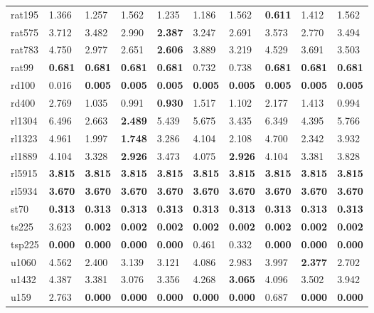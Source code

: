 \begin{tabular}{llllllllll}
rat195 & 1.366 & 1.257 & 1.562 & 1.235 & 1.186 & 1.562 & \textbf{0.611} & 1.412 & 1.562 \\
rat575 & 3.712 & 3.482 & 2.990 & \textbf{2.387} & 3.247 & 2.691 & 3.573 & 2.770 & 3.494 \\
rat783 & 4.750 & 2.977 & 2.651 & \textbf{2.606} & 3.889 & 3.219 & 4.529 & 3.691 & 3.503 \\
rat99 & \textbf{0.681} & \textbf{0.681} & \textbf{0.681} & \textbf{0.681} & 0.732 & 0.738 & \textbf{0.681} & \textbf{0.681} & \textbf{0.681} \\
rd100 & 0.016 & \textbf{0.005} & \textbf{0.005} & \textbf{0.005} & \textbf{0.005} & \textbf{0.005} & \textbf{0.005} & \textbf{0.005} & \textbf{0.005} \\
rd400 & 2.769 & 1.035 & 0.991 & \textbf{0.930} & 1.517 & 1.102 & 2.177 & 1.413 & 0.994 \\
rl1304 & 6.496 & 2.663 & \textbf{2.489} & 5.439 & 5.675 & 3.435 & 6.349 & 4.395 & 5.766 \\
rl1323 & 4.961 & 1.997 & \textbf{1.748} & 3.286 & 4.104 & 2.108 & 4.700 & 2.342 & 3.932 \\
rl1889 & 4.104 & 3.328 & \textbf{2.926} & 3.473 & 4.075 & \textbf{2.926} & 4.104 & 3.381 & 3.828 \\
rl5915 & \textbf{3.815} & \textbf{3.815} & \textbf{3.815} & \textbf{3.815} & \textbf{3.815} & \textbf{3.815} & \textbf{3.815} & \textbf{3.815} & \textbf{3.815} \\
rl5934 & \textbf{3.670} & \textbf{3.670} & \textbf{3.670} & \textbf{3.670} & \textbf{3.670} & \textbf{3.670} & \textbf{3.670} & \textbf{3.670} & \textbf{3.670} \\
st70 & \textbf{0.313} & \textbf{0.313} & \textbf{0.313} & \textbf{0.313} & \textbf{0.313} & \textbf{0.313} & \textbf{0.313} & \textbf{0.313} & \textbf{0.313} \\
ts225 & 3.623 & \textbf{0.002} & \textbf{0.002} & \textbf{0.002} & \textbf{0.002} & \textbf{0.002} & \textbf{0.002} & \textbf{0.002} & \textbf{0.002} \\
tsp225 & \textbf{0.000} & \textbf{0.000} & \textbf{0.000} & \textbf{0.000} & 0.461 & 0.332 & \textbf{0.000} & \textbf{0.000} & \textbf{0.000} \\
u1060 & 4.562 & 2.400 & 3.139 & 3.121 & 4.086 & 2.983 & 3.997 & \textbf{2.377} & 2.702 \\
u1432 & 4.387 & 3.381 & 3.076 & 3.356 & 4.268 & \textbf{3.065} & 4.096 & 3.502 & 3.942 \\
u159 & 2.763 & \textbf{0.000} & \textbf{0.000} & \textbf{0.000} & \textbf{0.000} & \textbf{0.000} & 0.687 & \textbf{0.000} & \textbf{0.000} \\

\end{tabular}
